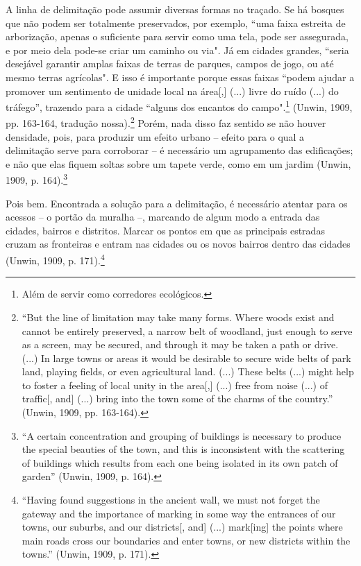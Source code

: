 \documentclass[12pt, a4paper]{book} %
\begin{document}
        A linha de delimitação pode assumir diversas formas no traçado. Se há bosques que não podem ser totalmente preservados, por exemplo, ``uma faixa estreita de arborização, apenas o suficiente para servir como uma tela, pode ser assegurada, e por meio dela pode-se criar um caminho ou via". Já em cidades grandes, ``seria desejável garantir amplas faixas de terras de parques, campos de jogo, ou até mesmo terras agrícolas". E isso é importante porque essas faixas ``podem ajudar a promover um sentimento de unidade local na área[,] (...) livre do ruído (...) do tráfego'', trazendo para a cidade ``alguns dos encantos do campo".\footnote[45]{Além de servir como corredores ecológicos.} (Unwin, 1909, pp. 163-164, tradução nossa).\footnote[46]{``But the line of limitation may take many forms. Where woods exist and cannot be entirely preserved, a narrow belt of woodland, just enough to serve as a screen, may be secured, and through it may be taken a path or drive. (...) In large towns or areas it would be desirable to secure wide belts of park land, playing fields, or even agricultural land. (...) These belts (...) might help to foster a feeling of local unity in the area[,] (...) free from noise (...) of traffic[, and] (...) bring into the town some of the charms of the country.'' (Unwin, 1909, pp. 163-164).} Porém, nada disso faz sentido se não houver densidade, pois, para produzir um efeito urbano – efeito para o qual a delimitação serve para corroborar – é necessário um agrupamento das edificações; e não que elas fiquem soltas sobre um tapete verde, como em um jardim (Unwin, 1909, p. 164).\footnote[47]{``A certain concentration and grouping of buildings is necessary to produce the special beauties of the town, and this is inconsistent with the scattering of buildings which results from each one being isolated in its own patch of garden'' (Unwin, 1909, p. 164).}

        Pois bem. Encontrada a solução para a delimitação, é necessário atentar para os acessos – o portão da muralha –, marcando de algum modo a entrada das cidades, bairros e distritos. Marcar os pontos em que as principais estradas cruzam as fronteiras e entram nas cidades ou os novos bairros dentro das cidades (Unwin, 1909, p. 171).\footnote[48]{``Having found suggestions in the ancient wall, we must not forget the gateway and the importance of marking in some way the entrances of our towns, our suburbs, and our districts[, and] (...) mark[ing] the points where main roads cross our boundaries and enter towns, or new districts within the towns.'' (Unwin, 1909, p. 171).}
\end{document}
